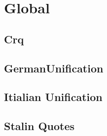\section{Global}
\subsection{Crq}

\subsection{GermanUnification}

\subsection{Itialian Unification}

\subsection{Stalin Quotes}

